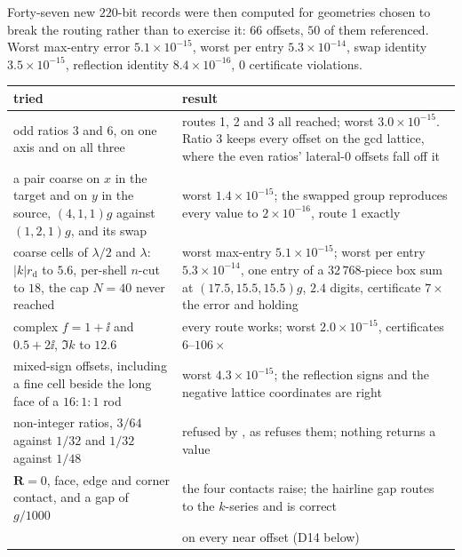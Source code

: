 Forty-seven new $220$-bit records were then computed for geometries chosen to break the
routing rather than to exercise it: $66$ offsets, $50$ of them referenced. Worst max-entry
error $5.1\times10^{-15}$, worst per entry $5.3\times10^{-14}$, swap identity
$3.5\times10^{-15}$, reflection identity $8.4\times10^{-16}$, $0$ certificate violations.

\begin{center}\footnotesize
\begin{tabular}{@{}L{0.42\textwidth}L{0.50\textwidth}@{}}
\toprule
tried & result\\
\midrule
odd ratios $3$ and $6$, on one axis and on all three & routes 1, 2 and 3 all reached; worst
$3.0\times10^{-15}$. Ratio $3$ keeps every offset on the gcd lattice, where the even ratios'
lateral-$0$ offsets fall off it\\
a pair coarse on $x$ in the target and on $y$ in the source, $(4,1,1)g$ against $(1,2,1)g$,
and its swap & worst $1.4\times10^{-15}$; the swapped group reproduces every value to
$2\times10^{-16}$, route 1 exactly\\
coarse cells of $\lambda/2$ and $\lambda$: $|k|r_{\mathrm{d}}$ to $5.6$, per-shell $n$-cut to
$18$, the cap $N = 40$ never reached & worst max-entry $5.1\times10^{-15}$; worst per entry
$5.3\times10^{-14}$, one entry of a $32\,768$-piece box sum at $(17.5,15.5,15.5)g$, $2.4$
digits, certificate $7\times$ the error and holding\\
complex $f = 1+\ii$ and $0.5+2\ii$, $\Im k$ to $12.6$ & every route works; worst
$2.0\times10^{-15}$, certificates $6$--$106\times$\\
mixed-sign offsets, including a fine cell beside the long face of a $16{:}1{:}1$ rod &
worst $4.3\times10^{-15}$; the reflection signs and the negative lattice coordinates are
right\\
non-integer ratios, $3/64$ against $1/32$ and $1/32$ against $1/48$ & refused by
, as  refuses them; nothing returns a value\\
$\mathbf{R} = 0$, face, edge and corner contact, and a gap of $g/1000$ & the four contacts
raise; the hairline gap routes to the $k$-series and is correct\\
 &  on every near offset (D14 below)\\
\bottomrule
\end{tabular}
\end{center}


